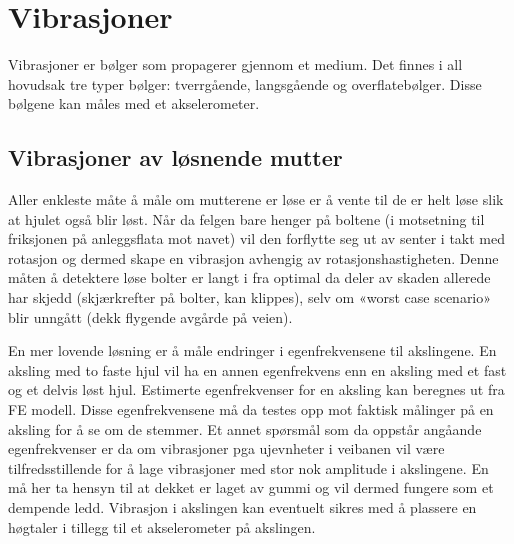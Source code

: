 \section{Vibrasjoner}
Vibrasjoner er bølger som propagerer gjennom et medium. Det finnes i 
all hovudsak tre typer bølger: tverrgående, langsgående og overflatebølger. 
Disse bølgene kan måles med et akselerometer.

\subsection{Vibrasjoner av løsnende mutter}
Aller enkleste måte å måle om mutterene er løse er å vente til 
de er helt løse slik at hjulet også blir løst. Når da felgen bare 
henger på boltene (i motsetning til friksjonen på anleggsflata 
mot navet) vil den forflytte seg ut av senter i takt med rotasjon 
og dermed skape en vibrasjon avhengig av rotasjonshastigheten. 
Denne måten å detektere løse bolter er langt i fra optimal da deler 
av skaden allerede har skjedd (skjærkrefter på bolter, kan klippes),
 selv om «worst case scenario» blir unngått (dekk flygende avgårde på veien).

En mer lovende løsning er å måle endringer i egenfrekvensene til 
akslingene. En aksling med to faste hjul vil ha en annen egenfrekvens 
enn en aksling med et fast og et delvis løst hjul. Estimerte egenfrekvenser 
for en aksling kan beregnes ut fra FE modell. Disse egenfrekvensene må 
da testes opp mot faktisk målinger på en aksling for å se om de stemmer. 
Et annet spørsmål som da oppstår angåande egenfrekvenser er da om 
vibrasjoner pga ujevnheter i veibanen vil være tilfredsstillende for å lage 
vibrasjoner med stor nok amplitude i akslingene. En må her ta hensyn til 
at dekket er laget av gummi og vil dermed fungere som et dempende ledd. 
Vibrasjon i akslingen kan eventuelt sikres med å plassere en høgtaler i 
tillegg til et akselerometer på akslingen.
